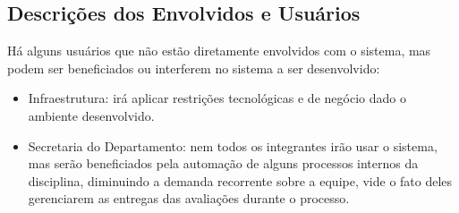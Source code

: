\begin{table}[!htb]
    \centering
    \caption{Sentença básica de posição do produto}
    \label{sentenca-posicao}
\end{table}


\subsection{Descrições dos Envolvidos e Usuários}
Há alguns usuários que não estão diretamente envolvidos com o sistema, mas podem ser beneficiados ou interferem no sistema a ser desenvolvido:

\begin{itemize}
    \item Infraestrutura: irá aplicar restrições tecnológicas e de negócio dado o ambiente desenvolvido.
    \item Secretaria do Departamento: nem todos os integrantes irão usar o sistema, mas serão beneficiados pela automação de alguns processos internos da disciplina, diminuindo a demanda recorrente sobre a equipe, vide o fato deles gerenciarem as entregas das avaliações durante o processo.
\end{itemize}

